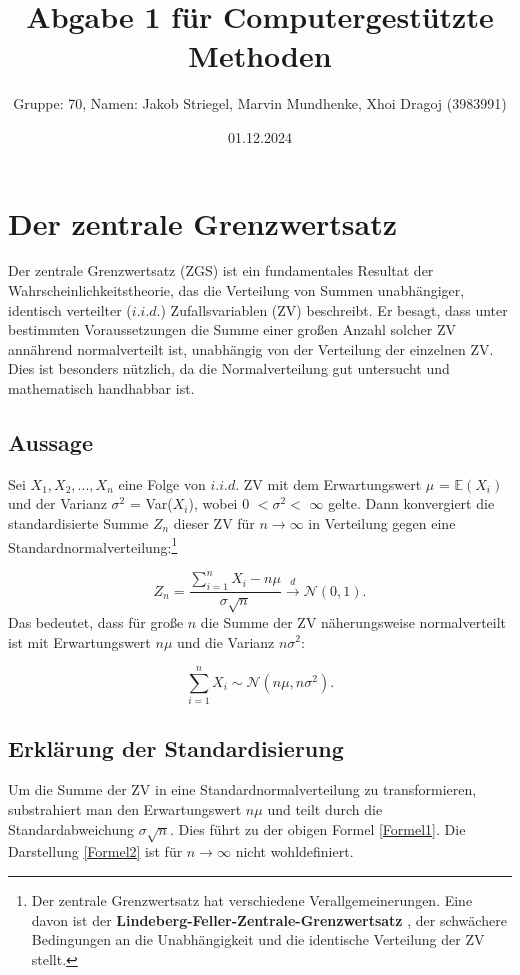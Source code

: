 \documentclass{article}
\title{Abgabe 1 für Computergestützte Methoden}
\author{Gruppe: 70, Namen: Jakob Striegel, Marvin Mundhenke, Xhoi Dragoj (3983991)}
\date{01.12.2024}
\begin{document}
\maketitle
\tableofcontents
\newpage
\section{Der zentrale Grenzwertsatz}
Der zentrale Grenzwertsatz (ZGS) ist ein fundamentales Resultat der Wahrscheinlichkeitstheorie, das die Verteilung von Summen unabhängiger, identisch verteilter ($i.i.d.$) Zufallsvariablen (ZV) beschreibt. Er besagt, dass unter bestimmten Voraussetzungen die Summe einer großen Anzahl solcher ZV annährend normalverteilt ist, unabhängig von der Verteilung der einzelnen ZV. Dies ist besonders nützlich, da die Normalverteilung gut untersucht und mathematisch handhabbar ist.



\subsection{Aussage}
Sei $ X_{1} ,X_{2},..., X_{n} $ eine Folge von $i.i.d.$ ZV mit dem Erwartungswert $\mu$  = $\mathbb{E}(X_{i})$ 
und der Varianz $\sigma^2$ = Var($X_{i}$), wobei  0 $< \sigma^2 <$ $ \infty$ gelte. Dann konvergiert
die standardisierte Summe $Z_{n}$  dieser ZV für $n \to  \infty$  in Verteilung gegen eine
Standardnormalverteilung:\footnote[1]{Der zentrale Grenzwertsatz hat verschiedene Verallgemeinerungen. Eine davon ist der \textbf{Lindeberg-Feller-Zentrale-Grenzwertsatz} \citep[Seite 328]{klenke}, der schwächere Bedingungen an die Unabhängigkeit und die identische Verteilung der ZV stellt.}

\begin{equation}
    \label{Formel1}
    Z_{n}= \frac{\sum_{i=1}^{n} X_{i}-n\mu}{\sigma \sqrt{n}} \overset{d}{\to} \mathcal{N}(0,1).
\end{equation}
Das bedeutet, dass für große $n$ die Summe der ZV näherungsweise normalverteilt ist mit Erwartungswert $n\mu$ und die Varianz $n\sigma^2$:

\begin{equation}
    \label{Formel2}
    \sum_{i=1}^{n} X_{i} \sim \mathcal{N}(n\mu,n\sigma^2).
\end{equation}



\subsection{Erklärung der Standardisierung}
Um die Summe der ZV in eine Standardnormalverteilung zu transformieren, substrahiert man den Erwartungswert $n\mu$ und teilt durch die Standardabweichung $\sigma\sqrt{n}$. Dies führt zu der obigen Formel \eqref{Formel1}. Die Darstellung \eqref{Formel2} ist für $n \to \infty$ nicht wohldefiniert.
\end{document}
